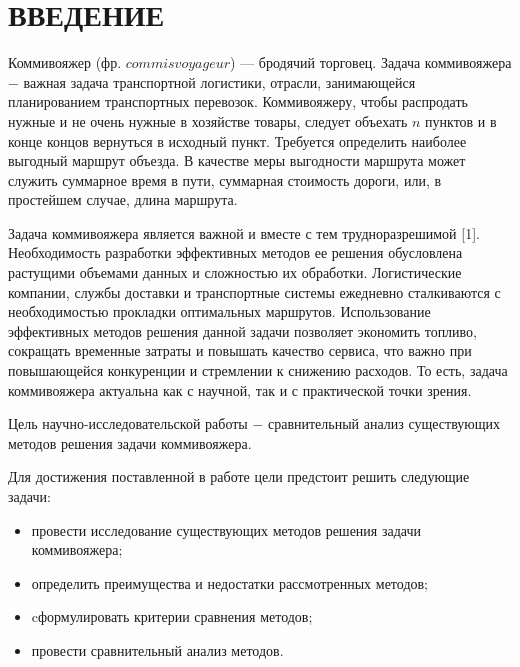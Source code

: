 \chapter*{ВВЕДЕНИЕ}

Коммивояжер (фр. $commis voyageur$) — бродячий торговец. Задача коммивояжера $-$ важная задача транспортной логистики, отрасли, занимающейся планированием транспортных перевозок. Коммивояжеру, чтобы распродать нужные и не очень нужные в хозяйстве товары, следует объехать $n$ пунктов и в конце концов вернуться в исходный пункт. Требуется определить наиболее выгодный маршрут объезда. В качестве меры выгодности маршрута может служить суммарное время в пути, суммарная стоимость дороги, или, в простейшем случае, длина маршрута.

Задача коммивояжера является важной и вместе с тем трудноразрешимой [1]. Необходимость разработки эффективных методов ее решения обусловлена растущими объемами данных и сложностью их обработки. Логистические компании, службы доставки и транспортные системы ежедневно сталкиваются с необходимостью прокладки оптимальных маршрутов. Использование эффективных методов решения данной задачи позволяет экономить топливо, сокращать временные затраты и повышать качество сервиса, что важно при повышающейся конкуренции и стремлении к снижению расходов. То есть, задача коммивояжера актуальна как с научной, так и с практической точки зрения.

Цель научно-исследовательской работы $-$ сравнительный анализ существующих методов решения задачи коммивояжера.

Для достижения поставленной в работе цели предстоит решить следующие задачи:
\begin{itemize}[label=---]
    \item провести исследование существующих методов решения задачи коммивояжера;
    \item определить преимущества и недостатки рассмотренных методов;
    \item cформулировать критерии сравнения методов;
    \item провести сравнительный анализ методов.
\end{itemize}


